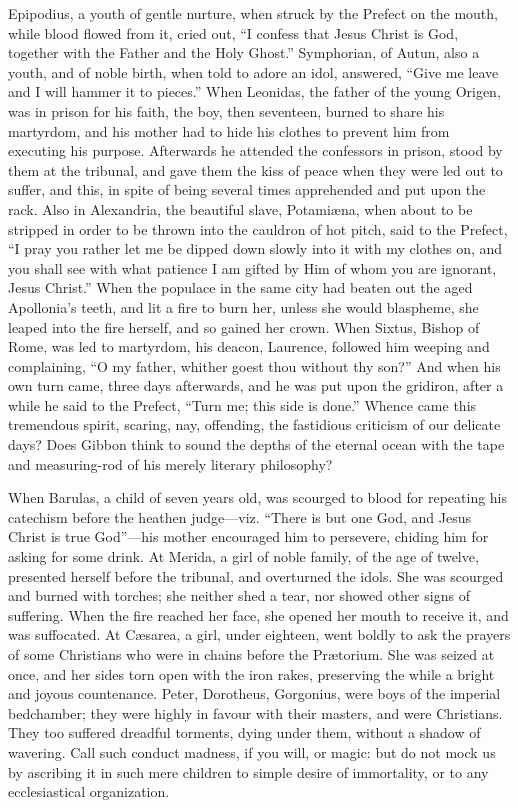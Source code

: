 Epipodius, a youth of gentle nurture, when struck by the Prefect on
the mouth, while blood flowed from it, cried out, ``I confess that
Jesus Christ is God, together with the Father and the Holy
Ghost.'' Symphorian, of Autun, also a youth, and of noble birth,
when told to adore an idol, answered, ``Give me leave and I will
hammer it to pieces.'' When Leonidas, the father of the
young Origen, was in prison for his faith, the boy, then seventeen,
burned to share his martyrdom, and his mother had to hide his clothes
to prevent him from executing his purpose. Afterwards he attended the
confessors in prison, stood by them at the tribunal, and gave them the
kiss of peace when they were led out to suffer, and this, in spite of
being several times apprehended and put upon the rack. Also in
Alexandria, the beautiful slave, Potamiæna, when about to be stripped
in order to be thrown into the cauldron of hot pitch, said to the
Prefect, ``I pray you rather let me be dipped down slowly into it
with my clothes on, and you shall see with what patience I am gifted
by Him of whom you are ignorant, Jesus Christ.'' When the populace
in the same city had beaten out the aged Apollonia's teeth, and lit a
fire to burn her, unless she would blaspheme, she leaped into the fire
herself, and so gained her crown. When Sixtus, Bishop of Rome, was led
to martyrdom, his deacon, Laurence, followed him weeping and
complaining, ``O my father, whither goest thou without thy
son?'' And when his own turn came, three days afterwards, and he
was put upon the gridiron, after a while he said to the Prefect,
``Turn me; this side is done.'' Whence came this tremendous
spirit, scaring, nay, offending, the fastidious criticism of our
delicate days? Does Gibbon think to sound the depths of the eternal
ocean with the tape and measuring-rod of his merely literary
philosophy?

When Barulas, a child of seven years old, was scourged to blood for
repeating his catechism before the heathen judge—viz.
``There is but one God, and Jesus Christ is true God''—his
mother encouraged him to persevere, chiding him for asking for some
drink. At Merida, a girl of noble family, of the age of twelve,
presented herself before the tribunal, and overturned the idols. She
was scourged and burned with torches; she neither shed a tear, nor
showed other signs of suffering. When the fire reached her face, she
opened her mouth to receive it, and was suffocated. At Cæsarea, a
girl, under eighteen, went boldly to ask the prayers of some
Christians who were in chains before the Prætorium. She was seized at
once, and her sides torn open with the iron rakes, preserving the
while a bright and joyous countenance. Peter, Dorotheus, Gorgonius,
were boys of the imperial bedchamber; they were highly in favour with
their masters, and were Christians. They too suffered dreadful
torments, dying under them, without a shadow of wavering. Call such
conduct madness, if you will, or magic: but do not mock us by
ascribing it in such mere children to simple desire of immortality, or
to any ecclesiastical organization.

